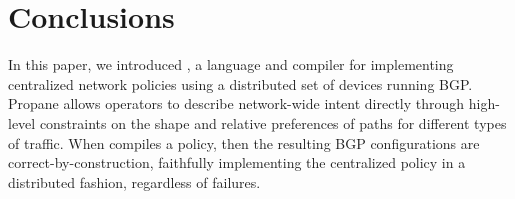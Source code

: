 \section{Conclusions}
\label{sec:conclusions}

In this paper, we introduced \sysname, a language and compiler for implementing centralized network policies using a distributed set of devices running BGP. Propane allows operators to describe network-wide intent directly through high-level constraints on the shape and relative preferences of paths for different types of traffic. When \sysname compiles a policy, then the resulting BGP configurations are correct-by-construction, faithfully implementing the centralized policy in a distributed fashion, regardless of failures.